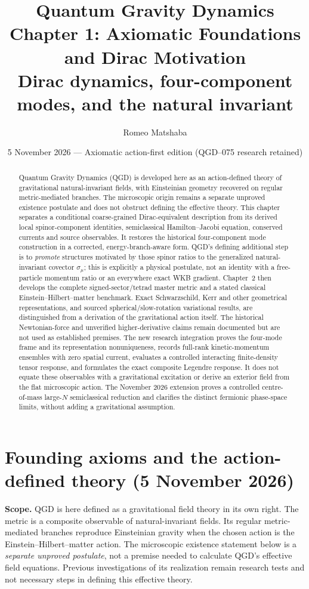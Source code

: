 \documentclass[11pt,a4paper]{article}
\title{\vspace{-9mm}\textbf{Quantum Gravity Dynamics}\\[4pt]
\large Chapter 1: Axiomatic Foundations and Dirac Motivation\\[6pt]
\normalsize Dirac dynamics, four-component modes, and the natural invariant}
\author{Romeo Matshaba}
\date{5 November 2026 --- Axiomatic action-first edition (QGD--075 research retained)}
\begin{document}
\maketitle
\begin{abstract}
Quantum Gravity Dynamics (QGD) is developed here as an action-defined theory of gravitational natural-invariant fields, with Einsteinian geometry recovered on regular metric-mediated branches. The microscopic origin remains a separate unproved existence postulate and does not obstruct defining the effective theory. This chapter separates a conditional coarse-grained Dirac-equivalent description from its derived local spinor-component identities, semiclassical Hamilton--Jacobi equation, conserved currents and source observables. It restores the historical four-component mode construction in a corrected, energy-branch-aware form. QGD's defining additional step is to \emph{promote} structures motivated by those spinor ratios to the generalized natural-invariant covector $\sigma_\mu$; this is explicitly a physical postulate, not an identity with a free-particle momentum ratio or an everywhere exact WKB gradient. Chapter~2 then develops the complete signed-sector/tetrad master metric and a stated classical Einstein--Hilbert--matter benchmark. Exact Schwarzschild, Kerr and other geometrical representations, and sourced spherical/slow-rotation variational results, are distinguished from a derivation of the gravitational action itself. The historical Newtonian-force and unverified higher-derivative claims remain documented but are not used as established premises. The new research integration proves the four-mode frame and its representation nonuniqueness, records full-rank kinetic-momentum ensembles with zero spatial current, evaluates a controlled interacting finite-density tensor response, and formulates the exact composite Legendre response. It does not equate these observables with a gravitational excitation or derive an exterior field from the flat microscopic action. The November 2026 extension proves a controlled centre-of-mass large-$N$ semiclassical reduction and clarifies the distinct fermionic phase-space limits, without adding a gravitational assumption.
\end{abstract}

\section*{Founding axioms and the action-defined theory (5 November 2026)}
\noindent\textbf{Scope.} QGD is here defined as a gravitational field theory in its own right. The metric is a composite observable of natural-invariant fields. Its regular metric-mediated branches reproduce Einsteinian gravity when the chosen action is the Einstein--Hilbert--matter action. The microscopic existence statement below is a \emph{separate unproved postulate}, not a premise needed to calculate QGD's effective field equations. Previous investigations of its realization remain research tests and not necessary steps in defining this effective theory.
\end{document}
